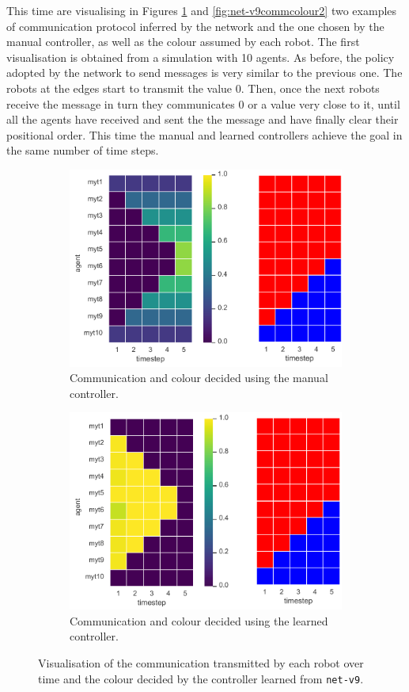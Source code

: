 This time are visualising in Figures \ref{fig:net-v9commcolour} and 
\ref{fig:net-v9commcolour2} two examples of communication protocol inferred 
by the network and the one chosen by the manual controller, as well as the colour 
assumed by each robot.
The first visualisation is obtained from a simulation with 10 agents. 
As before, the policy adopted by the network to send messages is very similar to 
the previous one. The robots at the edges start to transmit the value 0. Then, once 
the next robots receive the message in turn they communicates 0 or a value very 
close to it, until all the agents have received and sent the the message and have 
finally clear their positional order.
This time the manual and learned controllers achieve the goal in the same 
number of time steps.
\begin{figure}[!htb]
	\begin{subfigure}[h]{\textwidth}
		\centering
		\includegraphics[width=.6\textwidth]{contents/images/net-v9/manual-0}
		\caption{Communication and colour decided using the manual controller.}
	\end{subfigure}
	\hspace*{\fill}%
	\vspace*{8pt}%
	\hspace*{\fill}%
	\begin{subfigure}[h]{\textwidth}
		\centering			
		\includegraphics[width=.6\textwidth]{contents/images/net-v9/learned-0}
		\caption{Communication and colour decided using the learned controller.}
	\end{subfigure}
	\caption[Evaluation of the communication learned by 
	\texttt{net-v9}.]{Visualisation of the communication transmitted by each 
		robot over time and the colour decided by the controller learned from 
		\texttt{net-v9}.}	
	\label{fig:net-v9commcolour}
\end{figure}

